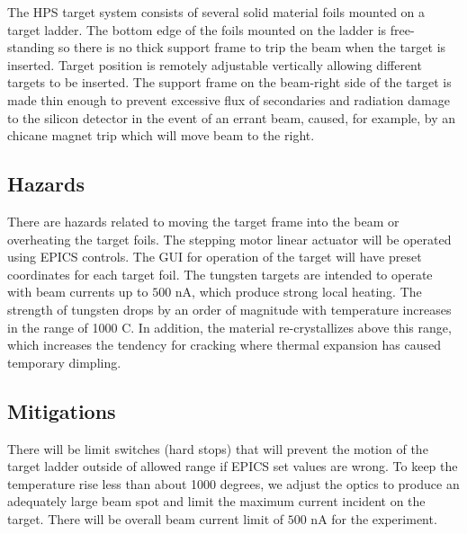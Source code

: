 

The HPS target system consists of several solid material foils mounted on a target ladder. The bottom edge of the foils mounted on the ladder is free-standing so there
is no thick support frame to trip the beam when the target is inserted. Target position is remotely  adjustable vertically allowing different targets to be inserted. The support
frame on the beam-right side of the target is made thin enough to
prevent excessive flux of secondaries and radiation damage to the silicon detector in the event of an errant
beam,  caused, for example, by an chicane magnet trip which will move beam to the right.
               
\subsection{Hazards} 

\indent

There are hazards related to moving the target frame into the beam or overheating the target foils. The stepping motor linear
actuator will be operated using EPICS controls.  The GUI for operation of the target will have preset coordinates for each target foil.  
The tungsten targets are intended to operate with beam currents up to $500$ nA, which produce strong local heating. The strength of tungsten drops by an order of magnitude with temperature increases in the range of 1000 C. In addition, the material re-crystallizes above
this range, which increases the tendency for cracking where thermal expansion has caused temporary dimpling. 

\subsection{Mitigations}

\indent

There will be limit switches (hard stops) that will prevent the motion of the target ladder outside of allowed range if EPICS set values are wrong. To keep the temperature rise less than about 1000 degrees, we adjust the optics to produce an adequately large beam spot and limit the maximum current incident on the target. There will be overall beam current limit of $500$ nA for the experiment.

